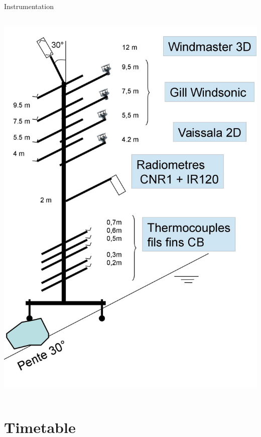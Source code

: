 \documentclass{beamer}
\begin{document}
\begin{frame}{Instrumentation}
\begin{columns}
\includegraphics[width=1.1\textwidth]{fig/0002.jpg}
\end{columns}

\end{frame}


\section{Timetable}
\end{document}
